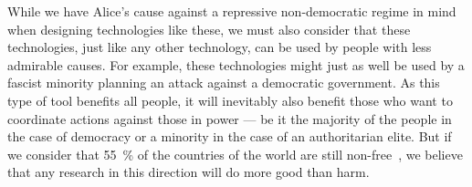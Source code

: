 While we have Alice's cause against a repressive non-democratic regime in mind 
when designing technologies like these, we must also consider that these 
technologies, just like any other technology, can be used by people with less admirable causes.
For example, these technologies might just as well be used by a fascist 
minority planning an attack against a democratic government.
As this type of tool benefits all people, it will inevitably also benefit those 
who want to coordinate actions against those in power --- be it the majority of 
the people in the case of democracy or a minority in the case of an 
authoritarian elite.
But if we consider that \SI{55}{\%} of the countries of the world are still 
non-free~\cite{FreedomInTheWorld2017}, we believe that any research in this 
direction will do more good than harm.

